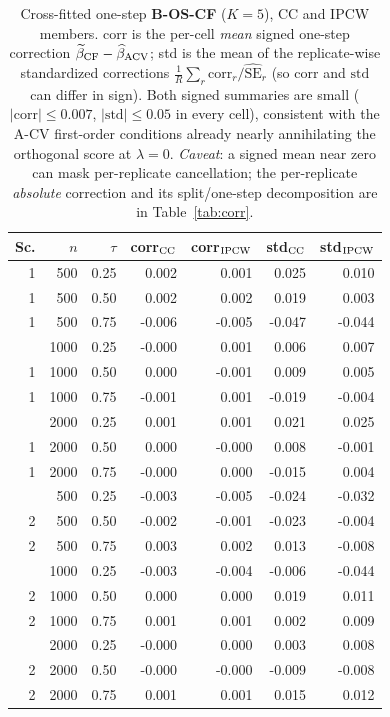 \begin{table}[t]\centering\small
\caption{Cross-fitted one-step \textbf{B-OS-CF} ($K=5$), CC and IPCW members. corr is the per-cell \emph{mean} signed one-step correction $\widetilde\beta_{\rm CF}-\widehat\beta_{\rm ACV}$; std is the mean of the replicate-wise standardized corrections $\frac1R\sum_r\mathrm{corr}_r/\widehat{\mathrm{SE}}_r$ (so $\mathrm{corr}$ and $\mathrm{std}$ can differ in sign). Both signed summaries are small ($|\mathrm{corr}|\le0.007$, $|\mathrm{std}|\le0.05$ in every cell), consistent with the A-CV first-order conditions already nearly annihilating the orthogonal score at $\lambda=0$. \emph{Caveat}: a signed mean near zero can mask per-replicate cancellation; the per-replicate \emph{absolute} correction and its split/one-step decomposition are in Table~\ref{tab:corr}.}
\label{tab:bosc}\begin{tabular}{rrr rr rr}\toprule
Sc.&$n$&$\tau$&corr$_{\rm CC}$&corr$_{\rm IPCW}$&std$_{\rm CC}$&std$_{\rm IPCW}$\\\midrule
1 & 500 & 0.25 & 0.002 & 0.001 & 0.025 & 0.010 \\
1 & 500 & 0.50 & 0.002 & 0.002 & 0.019 & 0.003 \\
1 & 500 & 0.75 & -0.006 & -0.005 & -0.047 & -0.044 \\
\addlinespace
1 & 1000 & 0.25 & -0.000 & 0.001 & 0.006 & 0.007 \\
1 & 1000 & 0.50 & 0.000 & -0.001 & 0.009 & 0.005 \\
1 & 1000 & 0.75 & -0.001 & 0.001 & -0.019 & -0.004 \\
\addlinespace
1 & 2000 & 0.25 & 0.001 & 0.001 & 0.021 & 0.025 \\
1 & 2000 & 0.50 & 0.000 & -0.000 & 0.008 & -0.001 \\
1 & 2000 & 0.75 & -0.000 & 0.000 & -0.015 & 0.004 \\
\addlinespace
2 & 500 & 0.25 & -0.003 & -0.005 & -0.024 & -0.032 \\
2 & 500 & 0.50 & -0.002 & -0.001 & -0.023 & -0.004 \\
2 & 500 & 0.75 & 0.003 & 0.002 & 0.013 & -0.008 \\
\addlinespace
2 & 1000 & 0.25 & -0.003 & -0.004 & -0.006 & -0.044 \\
2 & 1000 & 0.50 & 0.000 & 0.000 & 0.019 & 0.011 \\
2 & 1000 & 0.75 & 0.001 & 0.001 & 0.002 & 0.009 \\
\addlinespace
2 & 2000 & 0.25 & -0.000 & 0.000 & 0.003 & 0.008 \\
2 & 2000 & 0.50 & -0.000 & -0.000 & -0.009 & -0.008 \\
2 & 2000 & 0.75 & 0.001 & 0.001 & 0.015 & 0.012 \\
\bottomrule\end{tabular}\end{table}
